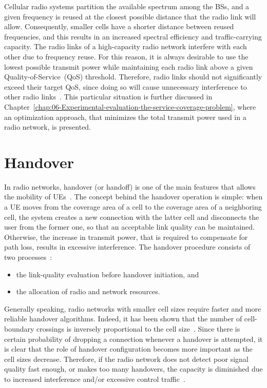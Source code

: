 Cellular radio systems partition the available spectrum among the
BSs, and a given frequency is reused at the closest possible distance
that the radio link will allow. Consequently, smaller cells have a
shorter distance between reused frequencies, and this results in an
increased spectral efficiency and traffic-carrying capacity. The radio
links of a high-capacity radio network interfere with each other due
to frequency reuse. For this reason, it is always desirable to use
the lowest possible transmit power while maintaining each radio link
above a given Quality-of-Service~(QoS)
threshold. Therefore, radio links should not significantly exceed
their target QoS, since doing so will cause unnecessary interference
to other radio links~\cite{Stuber-Principles_of_mobile_communication:2011}.
This particular situation is further discussed in Chapter~\ref{chap:06-Experimental-evaluation-the-service-coverage-problem},
where an optimization approach, that minimizes the total transmit
power used in a radio network, is presented.


\section{Handover \label{sub:02-Handover-and-soft-handover}}

In radio networks, handover (or handoff) is one of the main features
that allows the mobility of UEs~\cite{WCDMAforUMTS_RadioAccessForThirdGenerationMobileCommunications}.
The concept behind the handover operation is simple: when a UE moves
from the coverage area of a cell to the coverage area of a neighboring
cell, the system creates a new connection with the latter cell and
disconnects the user from the former one, so that an acceptable link
quality can be maintained. Otherwise, the increase in transmit power,
that is required to compensate for path loss, results in excessive
interference. The handover procedure consists of two processes~\cite{Stuber-Principles_of_mobile_communication:2011}:
\begin{itemize}
\item the link-quality evaluation before handover initiation, and
\item the allocation of radio and network resources.
\end{itemize}
Generally speaking, radio networks with smaller cell sizes require
faster and more reliable handover algorithms. Indeed, it has been
shown that the number of cell-boundary crossings is inversely proportional
to the cell size~\cite{Labedz-Handover_control_issues:1987}. Since
there is certain probability of dropping a connection whenever a handover
is attempted, it is clear that the role of handover configuration
becomes more important as the cell sizes decrease. Therefore, if the
radio network does not detect poor signal quality fast enough, or
makes too many handovers, the capacity is diminished due to increased
interference and/or excessive control traffic~\cite{Stuber-Principles_of_mobile_communication:2011}.



